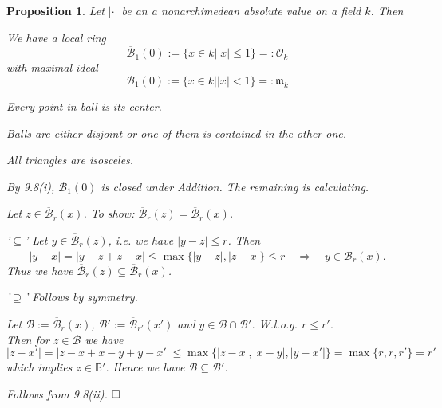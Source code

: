 \documentclass[11pt]{book}
\newtheorem{proposition}[theorem]{Proposition}
\theoremstyle{nonumberbreak}
\newenvironment{pr}[1][]{\ifthenelse{\equal{#1}{}}{\proof}{\proof[#1]}\rm}{\endproof}
\begin{document}
\begin{spacing}{1.3}
\begin{proposition} %
Let $|\cdot|$ be an a nonarchimedean absolute value on a field $k$. Then 
\begin{compactenum}
\item We have a local ring $$\overline{\mathcal{B}}_1(0):=\{x \in k \big \vert |x|\leqslant 1 \}=:\mathcal{O}_{k}$$with maximal ideal $$\mathcal{B}_1(0):=\{x \in k \big \vert |x| < 1 \}=:\mathfrak{m}_{k}$$
\item Every point in  ball is its center.
\item Balls are either disjoint or one of them is contained in the other one.
\item All triangles are isosceles.
\end{compactenum}
\begin{pr}
\begin{compactenum}
\item By 9.8(i), $\mathcal{B}_1(0)$ is closed under Addition. The remaining is calculating.
\item Let $z \in \overline{\mathcal{B}}_r(x)$. To show: $\overline{\mathcal{B}}_r(z)=\overline{\mathcal{B}}_r(x)$.
\begin{compactitem}
\item['$\subseteq$'] Let $y \in \overline{\mathcal{B}}_r(z)$, i.e. we have $|y-z|\leqslant r$. Then
$$|y-x|=|y-z+z-x| \leqslant \max\{|y-z|, |z-x|\} \leqslant r \quad \Rightarrow \quad y \in \overline{\mathcal{B}}_r(x).$$
Thus we have $\overline{\mathcal{B}}_r(z) \subseteq \overline{\mathcal{B}}_r(x)$.
\item['$\supseteq$'] Follows by symmetry.
\end{compactitem}
\item Let $\mathcal{B}:= \overline{\mathcal{B}}_r(x)$, $\mathcal{B}':=\overline{\mathcal{B}}_{r'}(x')$ and $y \in \mathcal{B} \cap \mathcal{B'}$. W.l.o.g. $r \leqslant r'$.\\
Then for $z \in \mathcal{B}$ we have
$$|z-x'|=|z-x+x-y+y-x'| \leqslant \max\{|z-x|, |x-y|, |y-x'|\} = \max\{r,r,r'\}=r'$$
which implies $z \in \mathbb{B}'$. Hence we have $\mathcal{B} \subseteq \mathcal{B}'$. 
\item Follows from 9.8(ii). $\hfill \Box$
\end{compactenum}
\end{pr}
\end{proposition}


\end{spacing}
\end{document}
